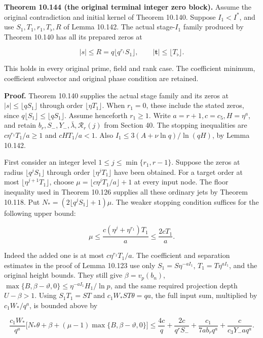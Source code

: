 \documentclass[
  11pt,
  a4paper,
]{article}
\begin{document}
\textbf{Theorem 10.144 (the original terminal integer zero block).}
Assume the original contradiction and initial kernel of Theorem 10.140.
Suppose \(I_1<I^*\), and use \(S_1,T_1,r_1,T_\flat,R\) of Lemma 10.142.
The actual stage-\(I_1\) family produced by Theorem 10.140 has all its
prepared zeros at

\[
|s|\le R=q\lfloor q^{r_1}S_1\rfloor,
\qquad |\boldsymbol t|\le\lfloor T_\flat\rfloor.
\tag{10.402}
\]

This holds in every original prime, field and rank case. The coefficient
minimum, coefficient subvector and original phase condition are
retained.

\textbf{Proof.} Theorem 10.140 supplies the actual stage family and its
zeros at \(|s|\le\lfloor qS_1\rfloor\) through order
\(\lfloor\eta T_1\rfloor\). When \(r_1=0\), these include the stated
zeros, since \(q\lfloor S_1\rfloor\le\lfloor qS_1\rfloor\). Assume
henceforth \(r_1\ge1\). Write \(a=r+1,c=c_5,H=\eta^a\), and retain
\(b_r,S_-,Y_-,\bar\lambda,\mathcal R_r(j)\) from Section 40. The
stopping inequalities are \(c\eta^{r_1}T_1/a\ge1\) and \(cHT_1/a<1\).
Also \(I_1\le3(A+\nu\ln q)/\ln(qH)\), by Lemma 10.142.

First consider an integer level \(1\le j\le\min\{r_1,r-1\}\). Suppose
the zeros at radius \(\lfloor q^jS_1\rfloor\) through order
\(\lfloor\eta^jT_1\rfloor\) have been obtained. For a target order at
most \(\lfloor\eta^{j+1}T_1\rfloor\), choose
\(\mu=\lfloor c\eta^jT_1/a\rfloor+1\) at every input node. The floor
inequality used in Theorem 10.126 supplies all these ordinary jets by
Theorem 10.118. Put \(N_*=(2\lfloor q^jS_1\rfloor+1)\mu\). The weaker
stopping condition suffices for the following upper bound:

\[
\mu\le\frac{c(\eta^j+\eta^{r_1})T_1}{a}
\le\frac{2cT_1}{a}.
\tag{10.403}
\]

Indeed the added one is at most \(c\eta^{r_1}T_1/a\). The coefficient
and separation estimates in the proof of Lemma 10.123 use only
\(S_1=S\eta^{-aI_1}\), \(T_1=T\eta^{aI_1}\), and the original height
bounds. They still give \(\beta=v_p(b_n)\),
\(\max\{B,\beta-\vartheta,0\}\le\eta^{-aI_1}H_1/\ln p\), and the same
required projection depth \(U-\beta>1\). Using \(S_1T_1=ST\) and
\(c_1W_*ST\theta=qa\), the full input sum, multiplied by \(c_1W_*/q^a\),
is bounded above by

\[
\frac{c_1W_*}{q^a}
\bigl[N_*\theta+\beta+(\mu-1)\max\{B,\beta-\vartheta,0\}\bigr]
\le\frac{4c}{q}+\frac{2c}{q^rS_-}
 +\frac{c_1}{7ab_rq^a}+\frac{c}{c_3Y_-aq^a}.
\tag{10.404}
\]
\end{document}
